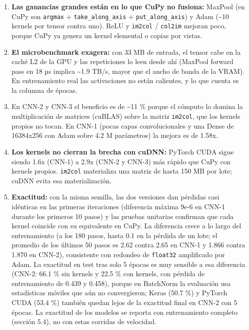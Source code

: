 \documentclass[
  11pt,
]{article}
\providecommand{\tightlist}{%
  \setlength{\itemsep}{0pt}\setlength{\parskip}{0pt}}
\begin{document}
\begin{enumerate}
\def\labelenumi{\arabic{enumi}.}
\tightlist
\item
  \textbf{Las ganancias grandes están en lo que CuPy no
  fusiona:} MaxPool (en CuPy son \texttt{argmax} +
  \texttt{take\_along\_axis} + \texttt{put\_along\_axis}) y
  Adam (\textasciitilde10 kernels por tensor contra uno).
  ReLU y \texttt{im2col} / \texttt{col2im} mejoran poco,
  porque CuPy ya genera un kernel elemental o copias por
  vistas.
\item
  \textbf{El microbenchmark exagera:} con 33 MB de entrada,
  el tensor cabe en la caché L2 de la GPU y las repeticiones
  lo leen desde ahí (MaxPool forward pass en 18 µs implica
  \textasciitilde1.9 TB/s, mayor que el ancho de banda de la
  VRAM). En entrenamiento real las activaciones no están
  calientes, y lo que cuenta es la columna de épocas.
\item
  En CNN-2 y CNN-3 el beneficio es de
  \textasciitilde11 \% porque el cómputo lo domina la
  multiplicación de matrices (cuBLAS) sobre la matriz
  \texttt{im2col}, que los kernels propios no tocan. En
  CNN-1 (pocas capas convolucionales y una Dense de
  16384x256 con Adam sobre 4.2 M parámetros) la mejora es de
  1.58x.
\item
  \textbf{Los kernels no cierran la brecha con cuDNN:}
  PyTorch CUDA sigue siendo 1.6x (CNN-1) a 2.9x (CNN-2 y
  CNN-3) más rápido que CuPy con kernels propios.
  \texttt{im2col} materializa una matriz de hasta 150 MB por
  lote; cuDNN evita esa materialización.
\item
  \textbf{Exactitud:} con la misma semilla, las dos
  versiones dan pérdidas casi idénticas en las primeras
  iteraciones (diferencia máxima 9e-6 en CNN-1 durante los
  primeros 10 pasos) y las pruebas unitarias confirman que
  cada kernel coincide con su equivalente en CuPy. La
  diferencia crece a lo largo del entrenamiento (a los 180
  pasos, hasta 0.1 en la pérdida de un lote; el promedio de
  los últimos 50 pasos es 2.62 contra 2.65 en CNN-1 y 1.866
  contra 1.870 en CNN-2), consistente con redondeo de
  \texttt{float32} amplificado por Adam. La exactitud en
  test tras solo 5 épocas es muy sensible a esa diferencia
  (CNN-2: 66.1 \% sin kernels y 22.5 \% con kernels, con
  pérdida de entrenamiento de 0.439 y 0.458), porque en
  BatchNorm la evaluación usa estadísticas móviles que aún
  no convergieron; Keras (50.7 \%) y PyTorch CUDA (53.4 \%)
  también quedan lejos de la exactitud final en CNN-2 con 5
  épocas. La exactitud de los modelos se reporta con
  entrenamiento completo (sección 5.4), no con estas
  corridas de velocidad.
\end{enumerate}
\end{document}
